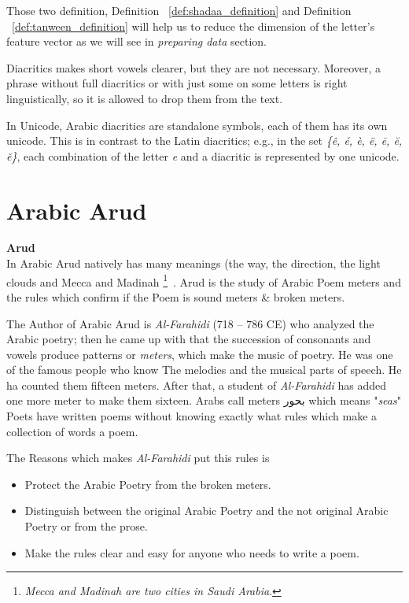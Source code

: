Those two definition, Definition ~\ref{def:shadaa_definition} and Definition ~\ref{def:tanween_definition}  will help us to reduce the dimension of the letter's feature vector as we will see in \textit{preparing data} section.


Diacritics makes short vowels clearer, but they are not necessary.
Moreover, a phrase without full diacritics or with just some on some letters is
right linguistically, so it is allowed to drop them from the text.

In Unicode, Arabic diacritics are standalone symbols, each of them has its own
unicode. This is in contrast to the Latin diacritics; e.g., in the set
\textit{\{ê, é, è, ë, ē, ĕ, ě\}}, each combination of the letter \textit{e} and a diacritic is represented by one unicode.



\section{Arabic Arud}
 


\begin{definition}\label{def:arud}
  \textbf{Arud} \hfill \\
  In Arabic Arud natively has many meanings (the way, the direction, the light clouds and Mecca and Madinah \footnote{\textit{Mecca and Madinah are two cities in  Saudi Arabia}.}~\cite{AlQuaed}. Arud is the study of Arabic Poem meters and the rules which confirm if the Poem is sound meters \& broken meters.
\end{definition}
 
The Author of Arabic Arud  is \textit{Al-Farahidi} (718 – 786 CE) who analyzed the Arabic poetry; then he came up with that the succession of consonants and vowels produce patterns or \textit{meters}, which make the music of poetry. He was one of the famous people who know The melodies and the musical parts of speech. He ha counted them fifteen meters.  After that, a student of \textit{Al-Farahidi} has added one more meter to make them sixteen. Arabs call meters \textarabic{بحور} which means "\textit{seas}" Poets have written poems without knowing exactly what rules which make a collection of words a poem.

The Reasons which makes \textit{Al-Farahidi} put this rules is

  \begin{itemize}
  \item Protect the Arabic Poetry from the broken meters.
  \item Distinguish between the original Arabic Poetry and the not original Arabic Poetry or from the prose.
    \item Make the rules clear and easy for anyone who needs to write a poem.
  \end{itemize}

